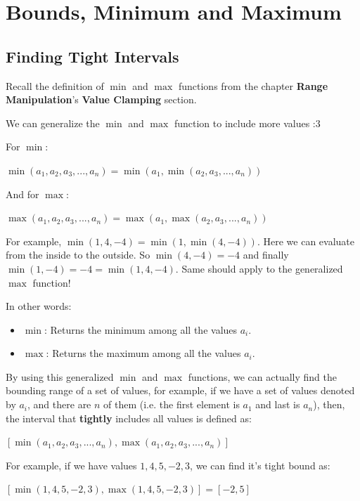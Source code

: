 \chapter{Bounds, Minimum and Maximum}

\section{Finding Tight Intervals}
Recall the definition of $\min$ and $\max$ functions from the chapter \textbf{Range Manipulation}'s \textbf{Value Clamping} section.

We can generalize the $\min$ and $\max$ function to include more values :3

For $\min$:
\begin{center}
        $\min(a_1, a_2, a_3, ..., a_n) = \min(a_1, \min(a_2, a_3, ..., a_n))$
\end{center}

And for $\max$:
\begin{center}
        $\max(a_1, a_2, a_3, ..., a_n) = \max(a_1, \max(a_2, a_3, ..., a_n))$
\end{center}

For example, $\min(1, 4, -4) = \min(1, \min(4, -4))$. Here we can evaluate from the inside to the outside.
So $\min(4, -4) = -4$ and finally $\min(1, -4) = -4 = \min(1, 4, -4)$. Same should apply to the generalized $\max$ function!

In other words:
\begin{itemize}
    \item $\min$: Returns the minimum among all the values $a_i$.
    \item $\max$: Returns the maximum among all the values $a_i$.
\end{itemize}

By using this generalized $\min$ and $\max$ functions, we can actually find the bounding range of a set of values,
for example, if we have a set of values denoted by $a_i$, and there are $n$ of them (i.e. the first element is $a_1$ and last is $a_n$),
then, the interval that \textbf{tightly} includes all values is defined as:
\begin{center}
    $[\min(a_1, a_2, a_3, ..., a_n), \max(a_1, a_2, a_3, ..., a_n)]$
\end{center}

For example, if we have values $1, 4, 5, -2, 3$, we can find it's tight bound as:
\begin{center}
    $[\min(1, 4, 5, -2, 3), \max(1, 4, 5, -2, 3)] = [-2, 5]$
\end{center}

